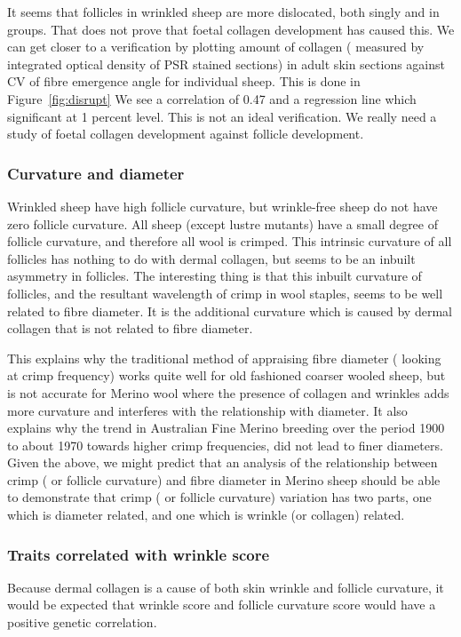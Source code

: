 \documentclass{article}
\begin{document}
It seems that follicles in wrinkled sheep are more dislocated, both singly and in groups. That does not prove that foetal collagen development  has caused this.  We can get closer to a verification by plotting amount of collagen ( measured by integrated optical density of PSR stained sections) in adult skin sections against CV of fibre emergence angle for individual sheep. This is done in Figure~\ref{fig:disrupt}
%
We see a correlation of 0.47  and a regression line which significant at 1 percent level.  This is not an ideal verification. We really need a study of foetal collagen development against follicle development.

\subsubsection{Curvature and diameter}
Wrinkled sheep have high follicle curvature, but wrinkle-free sheep do not have zero follicle curvature. All sheep (except lustre mutants) have a small degree of follicle curvature, and therefore all wool is crimped. This intrinsic curvature of all follicles has nothing to do with dermal collagen, but seems to be an inbuilt asymmetry in follicles. The interesting thing is that this inbuilt curvature of follicles, and the resultant wavelength of crimp in wool staples, seems to be well related to fibre diameter.  It is the additional curvature which is caused by dermal collagen that is not related to fibre diameter. 

This explains why the traditional method of appraising fibre diameter ( looking at crimp frequency) works quite well for old fashioned coarser wooled sheep, but is not accurate for Merino wool where the presence of collagen and wrinkles adds more curvature and interferes with the relationship with diameter. It also explains why the trend in Australian Fine Merino breeding over the period 1900 to about 1970 towards higher crimp frequencies, did not lead to finer diameters. 
Given the above, we might predict that an analysis of the relationship between crimp ( or follicle curvature) and fibre diameter in Merino sheep should be able to demonstrate that crimp ( or follicle curvature) variation has two parts, one which is diameter related, and one which is wrinkle (or collagen) related.


\subsubsection{Traits correlated with wrinkle score}
Because dermal collagen is a cause of both skin wrinkle and follicle curvature, it would be expected that wrinkle score and follicle curvature score would have a positive genetic correlation. 
\end{document}
